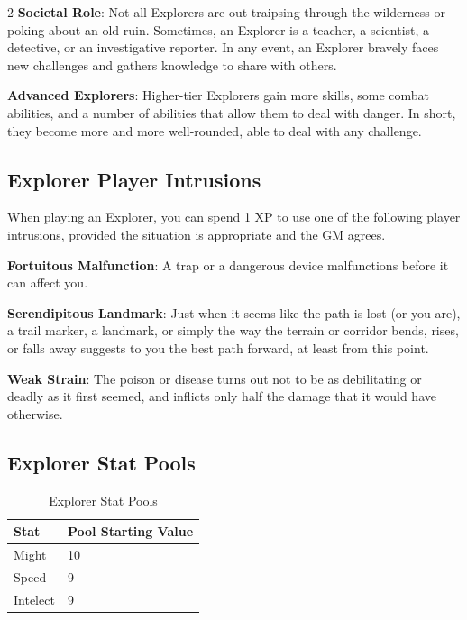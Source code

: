 \begin{multicols}{2}
\textbf{Societal Role}: Not all Explorers are out traipsing through the wilderness or poking about an old ruin. Sometimes, an Explorer is a teacher, a scientist, a detective, or an investigative reporter. In any event, an Explorer bravely faces new challenges and gathers knowledge to share with others.

\textbf{Advanced Explorers}: Higher-tier Explorers gain more skills, some combat abilities, and a number of abilities that allow them to deal with danger. In short, they become more and more well-rounded, able to deal with any challenge.

\subsection{Explorer Player Intrusions}
When playing an Explorer, you can spend 1 XP to use one of the following player intrusions, provided the situation is appropriate and the GM agrees.

\textbf{Fortuitous Malfunction}: A trap or a dangerous device malfunctions before it can affect you.

\textbf{Serendipitous Landmark}: Just when it seems like the path is lost (or you are), a trail marker, a landmark, or simply the way the terrain or corridor bends, rises, or falls away suggests to you the best path forward, at least from this point.

\textbf{Weak Strain}: The poison or disease turns out not to be as debilitating or deadly as it first seemed, and inflicts only half the damage that it would have otherwise.

\subsection{Explorer Stat Pools}

\begin{table}[H]
\centering
\caption{Explorer Stat Pools}
\label{tab: Explorer Stat Pools}

\begin{tabularx}{\linewidth}{| X | X |}
\hline
\textbf{Stat} & \textbf{Pool Starting Value} \\
\hline
Might & 10 \\ \hline
Speed & 9 \\ \hline
Intelect & 9  \\ \hline


\end{tabularx}
\end{table}
\end{multicols}
